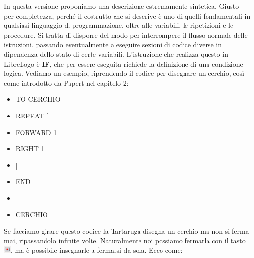In questa versione proponiamo una descrizione estremamente sintetica. Giusto per completezza, perché il costrutto che si descrive è uno di quelli fondamentali in qualsiasi linguaggio di programmazione, oltre alle variabili, le ripetizioni e le procedure. Si tratta di disporre del modo per interrompere il flusso normale delle istruzioni, passando eventualmente a eseguire sezioni di codice diverse in dipendenza dello stato di certe variabili. L'istruzione che realizza questo in LibreLogo è \textbf{IF}, che per essere eseguita richiede la definizione di una condizione logica. Vediamo un esempio, riprendendo il codice per disegnare un cerchio, così come introdotto da Papert nel capitolo 2:



\vskip 1cm

\begin{scriptsize}
\begin{minipage}{0.50\textwidth}
\begin{itemize}[itemsep=-3pt,parsep=2pt, leftmargin=-0.0mm ]
\item[] TO CERCHIO                 
\item[] \hspace{8pt} 	REPEAT [ 
\item[] \hspace{8pt}\hspace{8pt}		FORWARD 1 
\item[] \hspace{8pt}\hspace{8pt}		RIGHT 1
\item[] \hspace{8pt}	]
\item[] END                            
\item[] 
\item[] CERCHIO                       
\end{itemize}
\end{minipage}
\end{scriptsize}

\vskip 1cm

Se facciamo girare questo codice la Tartaruga disegna un cerchio ma non si
ferma mai, ripassandolo infinite volte. Naturalmente noi possiamo fermarla con
il tasto \includegraphics[height=1em]{./images/ripetere/StopLO.png}, ma è possibile insegnarle a fermarsi da sola. Ecco come:

\vskip 1cm


